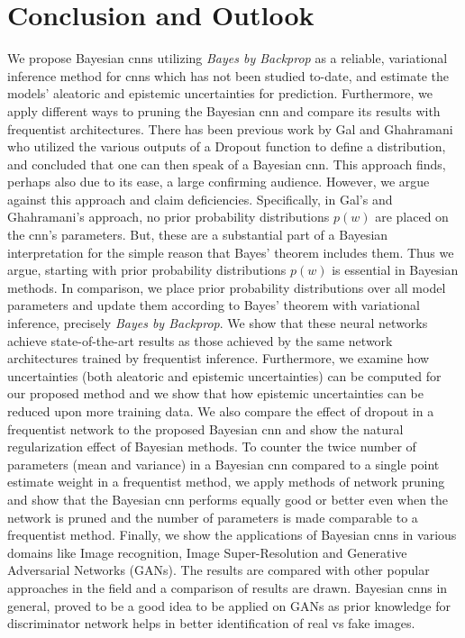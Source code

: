 \chapter{Conclusion and Outlook}

We propose Bayesian \acp{cnn} utilizing \textit{Bayes by Backprop} as a reliable, variational inference method for \acp{cnn} which has not been studied to-date, and estimate the models' aleatoric and epistemic uncertainties for prediction. Furthermore, we apply different ways to pruning the Bayesian \ac{cnn} and compare its results with frequentist architectures.
\newline There has been previous work by Gal and Ghahramani \cite{gal2015bayesian} who utilized the various outputs of a Dropout function to define a distribution, and concluded that one can then speak of a Bayesian \ac{cnn}. This approach finds, perhaps also due to its ease, a large confirming audience. However, we argue against this approach and claim deficiencies. Specifically, in Gal's and Ghahramani's \cite{gal2015bayesian} approach, no prior probability distributions $p(w)$ are placed on the \ac{cnn}'s parameters. But, these are a substantial part of a Bayesian interpretation for the simple reason that Bayes' theorem includes them. Thus we argue, starting with prior probability distributions $p(w)$ is essential in Bayesian methods. In comparison, we place prior probability distributions over all model parameters and update them according to Bayes' theorem with variational inference, precisely \textit{Bayes by Backprop}. We show that these neural networks achieve state-of-the-art results as those achieved by the same network architectures trained by frequentist inference. 
\newline Furthermore, we examine how uncertainties (both aleatoric and epistemic uncertainties) can be computed for our proposed method and we show that how epistemic uncertainties can be reduced upon more training data. We also compare the effect of dropout in a frequentist network to the proposed Bayesian \ac{cnn} and show the natural regularization effect of Bayesian methods. To counter the twice number of parameters (mean and variance) in a Bayesian \ac{cnn} compared to a single point estimate weight in a frequentist method, we apply methods of network pruning and show that the Bayesian \ac{cnn} performs equally good or better even when the network is pruned and the number of parameters is made comparable to a frequentist method. 
\newline Finally, we show the applications of Bayesian \acp{cnn} in various domains like Image recognition, Image Super-Resolution and Generative Adversarial Networks (GANs). The results are compared with other popular approaches in the field and a comparison of results are drawn. Bayesian \acp{cnn} in general, proved to be a good idea to be applied on GANs as prior knowledge for discriminator network helps in better identification of real vs fake images. \\


